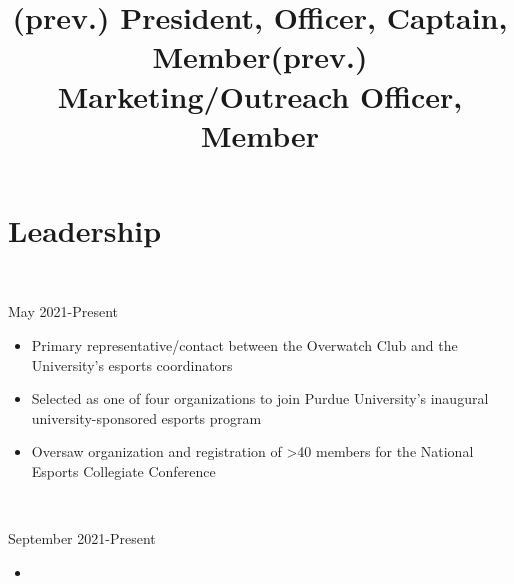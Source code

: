 \section{Leadership}
\\
\title{(prev.) President, Officer, Captain, Member}{May 2021-Present}
\begin{itemize}
    \item Primary representative/contact between the Overwatch Club and the University's esports coordinators
    \item Selected as one of four organizations to join Purdue University's inaugural university-sponsored esports program
    \item Oversaw organization and registration of >40 members for the National Esports Collegiate Conference
\end{itemize}
\\
\title{(prev.) Marketing/Outreach Officer, Member}{September 2021-Present}
\begin{itemize}
    \item \lipsum[5][2-4]
\end{itemize}